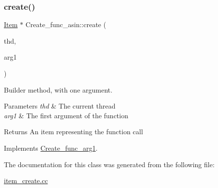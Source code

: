 \subsubsection{\texorpdfstring{create()}{create()}}
{\footnotesize\ttfamily \mbox{\hyperlink{classItem}{Item}} $\ast$ Create\+\_\+func\+\_\+asin\+::create (\begin{DoxyParamCaption}\item[{T\+HD $\ast$}]{thd,  }\item[{\mbox{\hyperlink{classItem}{Item}} $\ast$}]{arg1 }\end{DoxyParamCaption})\hspace{0.3cm}{\ttfamily [virtual]}}

Builder method, with one argument. 
\begin{DoxyParams}{Parameters}
{\em thd} & The current thread \\
\hline
{\em arg1} & The first argument of the function \\
\hline
\end{DoxyParams}
\begin{DoxyReturn}{Returns}
An item representing the function call 
\end{DoxyReturn}


Implements \mbox{\hyperlink{classCreate__func__arg1_a3e9a98f755cd82c3e762e334c955a8c9}{Create\+\_\+func\+\_\+arg1}}.



The documentation for this class was generated from the following file\+:\begin{DoxyCompactItemize}
\item 
\mbox{\hyperlink{item__create_8cc}{item\+\_\+create.\+cc}}\end{DoxyCompactItemize}
